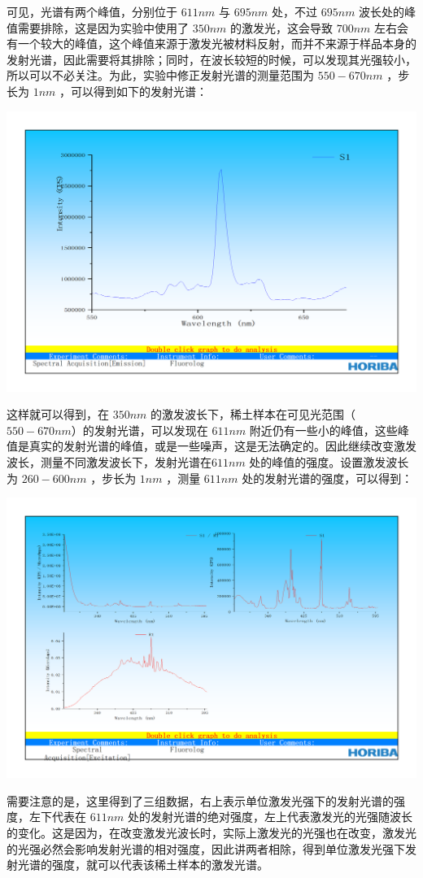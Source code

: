 \documentclass[hyperref]{ctexart}
\begin{document}
\begin{multicols}{2}
		可见，光谱有两个峰值，分别位于 $611nm$ 与 $695nm$ 处，不过 $695nm$ 波长处的峰值需要排除，这是因为实验中使用了 $350nm$ 的激发光，这会导致 $700nm$ 左右会有一个较大的峰值，这个峰值来源于激发光被材料反射，而并不来源于样品本身的发射光谱，因此需要将其排除；同时，在波长较短的时候，可以发现其光强较小，所以可以不必关注。为此，实验中修正发射光谱的测量范围为 $ 550-670nm$ ，步长为 $1nm$ ，可以得到如下的发射光谱：
		
		\includegraphics[width = 0.75\linewidth]{RE_Emission_Spectroscopy_550-670_350.png}
		
		这样就可以得到，在 $350nm$ 的激发波长下，稀土样本在可见光范围（$550-670nm$）的发射光谱，可以发现在 $611nm$ 附近仍有一些小的峰值，这些峰值是真实的发射光谱的峰值，或是一些噪声，这是无法确定的。因此继续改变激发波长，测量不同激发波长下，发射光谱在$611nm$ 处的峰值的强度。设置激发波长为 $260-600nm$ ，步长为 $1nm$ ，测量 $611nm$ 处的发射光谱的强度，可以得到：
		
		\includegraphics[width = 0.75\linewidth]{RE_Emission_Spectroscopy_611_260-600.png}
		
		需要注意的是，这里得到了三组数据，右上表示单位激发光强下的发射光谱的强度，左下代表在 $611nm$ 处的发射光谱的绝对强度，左上代表激发光的光强随波长的变化。这是因为，在改变激发光波长时，实际上激发光的光强也在改变，激发光的光强必然会影响发射光谱的相对强度，因此讲两者相除，得到单位激发光强下发射光谱的强度，就可以代表该稀土样本的激发光谱。
		

\end{multicols}
\end{document}
